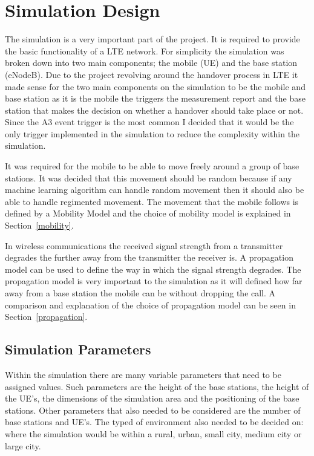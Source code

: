 \chapter{Simulation Design}
The simulation is a very important part of the project. It is required to provide the basic functionality of a LTE network. For simplicity the simulation was broken down into two main components; the mobile (UE) and the base station (eNodeB). Due to the project revolving around the handover process in LTE it made sense for the two main components on the simulation to be the mobile and base station as it is the mobile the triggers the measurement report and the base station that makes the decision on whether a handover should take place or not. Since the A3 event trigger is the most common I decided that it would be the only trigger implemented in the simulation to reduce the complexity within the simulation.

It was required for the mobile to be able to move freely around a group of base stations. It was decided that this movement should be random because if any machine learning algorithm can handle random movement then it should also be able to handle regimented movement. The movement that the mobile follows is defined by a Mobility Model and the choice of mobility model is explained in Section~\ref{mobility}.

In wireless communications the received signal strength from a transmitter degrades the further away from the transmitter the receiver is. A propagation model can be used to define the way in which the signal strength degrades. The propagation model is very important to the simulation as it will defined how far away from a base station the mobile can be without dropping the call. A comparison and explanation of the choice of propagation model can be seen in Section~\ref{propagation}.
\section{Simulation Parameters}
Within the simulation there are many variable parameters that need to be assigned values. Such parameters are the height of the base stations, the height of the UE's, the dimensions of the simulation area and the positioning of the base stations. Other parameters that also needed to be considered are the number of base stations and UE's. The typed of environment also needed to be decided on: where the simulation would be within a rural, urban, small city, medium city or large city.

